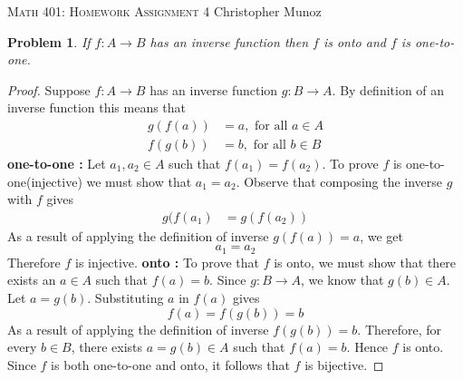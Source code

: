 \documentclass[12pt]{article}
\newtheorem{problem}{Problem}
\begin{document}
\small
\noindent \textsc{Math 401: Homework Assignment 4} \hfill Christopher Munoz

\normalsize
\bigskip

\setcounter{problem}{21}


\begin{problem} %
If $f:A\to B$ has an inverse function then $f$ is onto and $f$ is one-to-one.
\end{problem}

\begin{proof}
Suppose $f : A \to B$ has an inverse function $g : B \to A$. By definition of an inverse function this means that 
\begin{align*}
	g(f(a)) &= a, \text{ for all } a \in A \\
	f(g(b)) &= b, \text{ for all } b \in B
\end{align*}
\textbf{one-to-one : }Let $a_1, a_2 \in A$ such that $f(a_1) = f(a_2)$. To prove $f$ is one-to-one(injective) we must show that $a_1 = a_2$. Observe that composing the inverse $g$ with $f$ gives
\begin{align*} 
	g(f(a_1) &= g(f(a_2)) 
\end{align*}
As a result of applying the definition of inverse $g(f(a)) = a$, we get
$$a_1 = a_2$$
Therefore $f$ is injective. \newline
\textbf{onto : } To prove that $f$ is onto, we must show that there exists an $a \in A$ such that $f(a) = b$. Since $g : B \to A$, we know that $g(b) \in A$. Let $a = g(b)$. Substituting $a$ in $f(a)$ gives
$$f(a) = f(g(b)) = b$$
As a result of applying the definition of inverse $f(g(b)) = b$.
Therefore, for every $b \in B$, there exists $a =g(b) \in A$ such that $f(a) = b$.
Hence $f$ is onto. \newline \newline
Since $f$ is both one-to-one and onto, it follows that $f$ is bijective.
\end{proof} 



\end{document}
